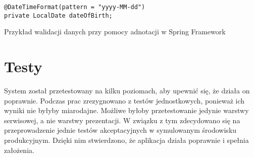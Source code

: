 \begin{listing}
    \begin{verbatim}
@DateTimeFormat(pattern = "yyyy-MM-dd")
private LocalDate dateOfBirth;
\end{verbatim}
    \caption{Przykład walidacji danych przy pomocy adnotacji w Spring Framework}
    \label{lst:validation}
\end{listing}

\section{Testy}

System został przetestowany na kilku poziomach, aby upewnić się, że działa on poprawnie. Podczas prac zrezygnowano z testów jednostkowych, ponieważ ich wyniki nie byłyby miarodajne. Możliwe byłoby przetestowanie jedynie warstwy serwisowej, a nie warstwy prezentacji. W związku z tym zdecydowano się na przeprowadzenie jednie testów akceptacyjnych w symulowanym środowisku produkcyjnym. Dzięki nim stwierdzono, że aplikacja działa poprawnie i spełnia założenia.